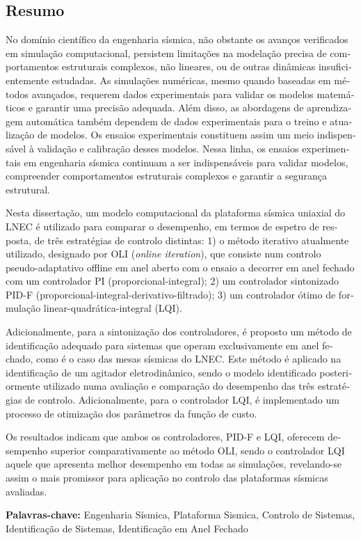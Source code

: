 \documentclass[  10pt, twoside]{report} %
\numberwithin{equation}{chapter}
\begin{document}
\newpage



\begin{otherlanguage}{portuguese}
\section*{Resumo}

No domínio científico da engenharia sísmica, não obstante os avanços verificados em simulação computacional, persistem limitações na modelação precisa de comportamentos estruturais complexos, não lineares, ou de outras dinâmicas insuficientemente estudadas. As simulações numéricas, mesmo quando baseadas em métodos avançados, requerem dados experimentais para validar os modelos matemáticos e garantir uma precisão adequada. Além disso, as abordagens de aprendizagem automática também dependem de dados experimentais para o treino e atualização de modelos. Os ensaios experimentais constituem assim um meio indispensável à validação e calibração desses modelos. Nessa linha, os ensaios experimentais em engenharia sísmica continuam a ser indispensáveis para validar modelos, compreender comportamentos estruturais complexos e garantir a segurança estrutural.

Nesta dissertação, um modelo computacional da plataforma sísmica uniaxial do LNEC é utilizado para comparar o desempenho, em termos de espetro de resposta, de três estratégias de controlo distintas: 1) o método iterativo atualmente utilizado, designado por  OLI (\emph{online iteration}), que consiste num controlo pseudo-adaptativo offline em anel aberto com o ensaio a decorrer em anel fechado com um controlador PI (proporcional-integral); 2) um controlador sintonizado PID-F (proporcional-integral-derivativo-filtrado); 3) um controlador ótimo de formulação linear-quadrática-integral (LQI).

Adicionalmente, para a sintonização dos controladores, é proposto um método de identificação adequado para sistemas que operam exclusivamente em anel fechado, como é o caso das mesas sísmicas do LNEC. Este método é aplicado na identificação de um agitador eletrodinâmico, sendo o modelo identificado posteriormente utilizado numa avaliação e comparação do desempenho das três estratégias de controlo. Adicionalmente, para o controlador LQI, é implementado um processo de otimização dos parâmetros da função de custo.

Os resultados indicam que ambos os controladores, PID-F e LQI, oferecem desempenho superior comparativamente ao método OLI, sendo o controlador LQI aquele que apresenta melhor desempenho em todas as simulações, revelando-se assim o mais promissor para aplicação no controlo das plataformas sísmicas avaliadas.

\vfill

\textbf{Palavras-chave:} Engenharia Sísmica, Plataforma Sismica,  Controlo de Sistemas, Identificação de Sistemas, Identificação em Anel Fechado
\end{otherlanguage}
\end{document}
